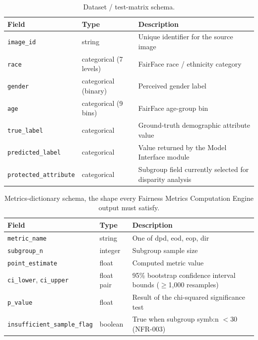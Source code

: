 \begin{table}[htbp]
    \centering
    \caption{Dataset / test-matrix schema.}
    \label{tab:schema-testmatrix}
    \begin{tabular}{p{3.2cm}p{2.8cm}p{7.3cm}}
        \toprule
        \textbf{Field} & \textbf{Type} & \textbf{Description} \\
        \midrule
        \texttt{image\_id} & string & Unique identifier for the source image \\
        \texttt{race} & categorical (7 levels) & FairFace race / ethnicity category \\
        \texttt{gender} & categorical (binary) & Perceived gender label \\
        \texttt{age} & categorical (9 bins) & FairFace age-group bin \\
        \texttt{true\_label} & categorical & Ground-truth demographic attribute value \\
        \texttt{predicted\_label} & categorical & Value returned by the Model Interface module \\
        \texttt{protected\_attribute} & categorical & Subgroup field currently selected for disparity analysis \\
        \bottomrule
    \end{tabular}
\end{table}

\begin{table}[htbp]
    \centering
    \caption{Metrics-dictionary schema, the shape every Fairness Metrics Computation Engine output must satisfy.}
    \label{tab:schema-metrics}
    \begin{tabular}{p{3.5cm}p{2.5cm}p{7.2cm}}
        \toprule
        \textbf{Field} & \textbf{Type} & \textbf{Description} \\
        \midrule
        \texttt{metric\_name} & string & One of \gls{dpd}, \gls{eod}, \gls{eop}, \gls{dir} \\
        \texttt{subgroup\_n} & integer & Subgroup sample size \\
        \texttt{point\_estimate} & float & Computed metric value \\
        \texttt{ci\_lower}, \texttt{ci\_upper} & float pair & 95\% bootstrap confidence interval bounds ($\geq$1{,}000 resamples) \\
        \texttt{p\_value} & float & Result of the chi-squared significance test \\
        \texttt{insufficient\_sample\_flag} & boolean & True when subgroup \gls{symb:n} $< 30$ (NFR-003) \\
        \bottomrule
    \end{tabular}
\end{table}

